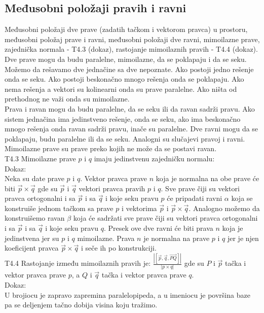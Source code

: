 \documentclass[12pt]{article}
\newcommand{\vek}[1]{\overrightarrow{#1}}
\begin{document}
    \subsection{Međusobni položaji pravih i ravni}
    \label{subsec:pitanje_16}
    Međusobni položaji dve prave (zadatih tačkom i vektorom
    pravca) u prostoru, međusobni položaj prave i ravni,
    međusobni položaji dve ravni, mimoilazne prave, zajednička
    normala - T4.3 (dokaz), rastojanje mimoilaznih pravih -
    T4.4 (dokaz).
    \\[1cm]
    Dve prave mogu da budu paralelne, mimoilazne,
    da se poklapaju i da se seku. Možemo da rešavamo
    dve jednačine sa dve nepoznate. Ako postoji
    jedno rešenje onda se seku. Ako postoji beskonačno
    mnogo rešenja onda se poklapaju. Ako nema rešenja
    a vektori su kolinearni onda su prave paralelne.
    Ako ništa od prethodnog ne važi onda su mimoilazne.\\
    Prava i ravan mogu da budu paralelne, da se seku
    ili da ravan sadrži pravu. Ako sistem jednačina
    ima jedinstveno rešenje, onda se seku, ako ima
    beskonačno mnogo rešenja onda ravan sadrži pravu,
    inače su paralelne.
    Dve ravni mogu da se poklapaju, budu paralelne ili da se seku.
    Analogni su slučajevi pravoj i ravni.\\
    Mimoilazne prave su prave preko kojih ne može da se
    postavi ravan.\\
    T4.3 Mimoilazne prave $p$ i $q$ imaju jedinstvenu
    zajedničku normalu:\\
    Dokaz:\\
    Neka su date prave $p$ i $q$. Vektor pravca
    prave $n$ koja je normalna na obe prave će
    biti $\vek{p}\times\vek{q}$ gde su
$\vek{p}$ i $\vek{q}$ vektori
    pravca pravih $p$ i $q$. Sve prave čiji su
    vektori pravca ortogonalni
    i sa $\vek{p}$ i sa $\vek{q}$
    i koje seku pravu $p$ će
    pripadati ravni $\alpha$ koja se konstruiše
    jednom tačkom sa prave $p$ i vektorima $\vek{p}$
    i $\vek{p}\times\vek{q}$.
    Analogno možemo da konstruišemo ravan $\beta$
    koja će sadržati sve prave čiji su
    vektori pravca ortogonalni
    i sa $\vek{p}$ i sa $\vek{q}$
    i koje seku pravu $q$. Presek ove dve ravni
    će biti prava $n$ koja je jedinstvena jer
    su $p$ i $q$ mimoilazne. Prava $n$ je normalna
    na prave $p$ i $q$ jer je njen koeficijent pravca
$\vek{p}\times \vek{q}$ i seče
    ih po konstrukciji.\\
    T4.4 Rastojanje između mimoilaznih pravih je:
$\frac{|[\vek{p},\vek{q},\vek{PQ}]|}{|p\times q|}$ gde su
$P$ i $\vek{p}$ tačka i vektor pravca prave $p$,
    a $Q$ i $\vek{q}$ tačka i vektor pravca prave $q$.\\
    Dokaz:\\
    U brojiocu je zapravo zapremina paralelopipeda, a u
    imeniocu je površina baze pa se deljenjem tačno dobija
    visina koju tražimo.
\end{document}
